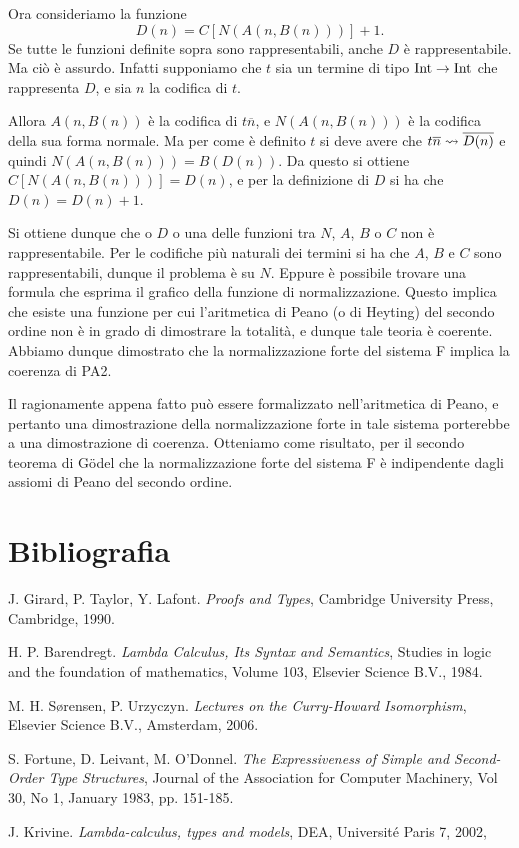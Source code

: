 \documentclass[]{marticle}
\begin{document}
Ora consideriamo la funzione
\[
    D(n) = C[N(A(n, B(n)))] + 1.
\]
Se tutte le funzioni definite sopra sono rappresentabili, anche $D$ \`e
rappresentabile. Ma ci\`o \`e assurdo. Infatti supponiamo che $t$ sia un termine
di tipo $\text{Int}\rightarrow\text{Int}$ che rappresenta $D$, e sia $n$ la codifica di $t$. 

Allora $A(n, B(n))$ \`e la codifica di $t\overline{n}$, e $N(A(n, B(n)))$ \`e la
codifica della sua forma normale. Ma per come \`e definito $t$ si deve avere che
$t\overline{n} \rightsquigarrow \overline{D(n)}$ e quindi $N(A(n, B(n))) = B(D(n))$.
Da questo si ottiene $C[N(A(n, B(n)))] = D(n)$, e per la definizione di $D$ si
ha che $D(n) = D(n)+1$.

Si ottiene dunque che o $D$ o una delle funzioni tra $N$, $A$, $B$ o $C$ non \`e
rappresentabile. Per le codifiche pi\`u naturali dei termini si ha che $A$, $B$
e $C$ sono rappresentabili, dunque il problema \`e su $N$. Eppure \`e possibile
trovare una formula che esprima il grafico della funzione di normalizzazione.
Questo implica che esiste una funzione per cui l'aritmetica di
Peano (o di Heyting) del secondo ordine non \`e in grado di dimostrare la
totalit\`a, e dunque tale teoria \`e coerente. Abbiamo dunque dimostrato che la
normalizzazione forte del sistema F implica la coerenza di PA2.

Il ragionamente appena fatto pu\`o essere formalizzato nell'aritmetica di Peano,
e pertanto una dimostrazione della normalizzazione forte in tale sistema
porterebbe a una dimostrazione di coerenza. Otteniamo come risultato, per il
secondo teorema di G\"odel che la normalizzazione forte del sistema F \`e
indipendente dagli assiomi di Peano del secondo ordine.

\section{Bibliografia}
\begin{thebibliography}{0}
    J. Girard, P. Taylor, Y. Lafont.
    \textit{Proofs and Types},
    Cambridge University Press,
    Cambridge,
    1990.

    H. P. Barendregt.
    \textit{Lambda Calculus, Its Syntax and Semantics}, Studies in logic and the
        foundation of mathematics, Volume 103,
    Elsevier Science B.V.,
    1984.

    M. H. S{\o}rensen, P. Urzyczyn.
    \textit{Lectures on the Curry-Howard Isomorphism},
    Elsevier Science B.V.,
    Amsterdam,
    2006.

    S. Fortune, D. Leivant, M. O'Donnel.
    \textit{The Expressiveness of Simple and Second-Order Type Structures},
    Journal of the Association for Computer Machinery, Vol 30, No 1, January
        1983, pp. 151-185.

    J. Krivine.
    \textit{Lambda-calculus, types and models},
    DEA, Université Paris 7, 2002,

\end{thebibliography}
\end{document}
